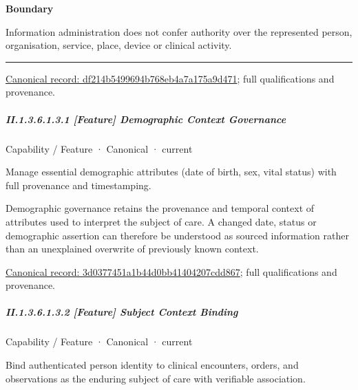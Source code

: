\textbf{Boundary}



Information administration does not confer authority over the represented person, organisation, service, place, device or clinical activity.



\medskip\hrule\medskip

{\footnotesize \href{../../../../continuum/strategy/capability/df214b5499694b768eb4a7a175a9d471.md}{Canonical record: df214b5499694b768eb4a7a175a9d471}; full qualifications and provenance.}\par
\subparagraph*{II.1.3.6.1.3.1 [Feature] Demographic Context Governance}
\label{navigation:II.1.3.6.1.3.1}

\label{element:3d0377451a1b44d0bb41404207cdd867}
{\small Capability / Feature · Canonical · current}\par

Manage essential demographic attributes (date of birth, sex, vital status) with full provenance and timestamping.



Demographic governance retains the provenance and temporal context of attributes used to interpret the subject of care. A changed date, status or demographic assertion can therefore be understood as sourced information rather than an unexplained overwrite of previously known context.


{\footnotesize \href{../../../../continuum/strategy/capability/feature/3d0377451a1b44d0bb41404207cdd867.md}{Canonical record: 3d0377451a1b44d0bb41404207cdd867}; full qualifications and provenance.}\par
\subparagraph*{II.1.3.6.1.3.2 [Feature] Subject Context Binding}
\label{navigation:II.1.3.6.1.3.2}

\label{element:5d956689bc714e2d8be4fff7766c0b2d}
{\small Capability / Feature · Canonical · current}\par

Bind authenticated person identity to clinical encounters, orders, and observations as the enduring subject of care with verifiable association.



